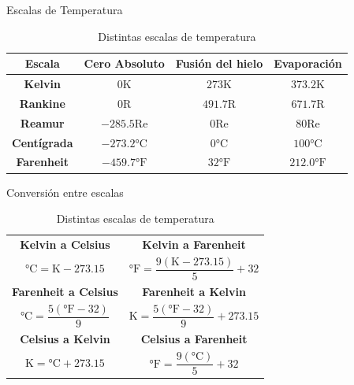 \documentclass[aspectratio=169]{beamer}
\begin{document}
\begin{frame}{Escalas de Temperatura}
\begin{table}[c]
    \centering
    \begin{tabular}{cccc}
        \toprule
        \textbf{Escala} & \textbf{Cero Absoluto} &\textbf{Fusión del hielo} & \textbf{Evaporación} \\
        \midrule
        \textbf{Kelvin} & $0\si{\kelvin}$ & $273\si{\kelvin}$ & $373.2\si{\kelvin}$ \\
        \textbf{Rankine} & $0\mathrm{R}$ & $491.7\mathrm{R}$ & $671.7\mathrm{R}$ \\
        \textbf{Reamur} & $-285.5\mathrm{Re}$ & $0\mathrm{Re}$ & $80\mathrm{Re}$ \\
        \textbf{Centígrada} & $-273.2\si{\celsius}$ & $0\si{\celsius}$ & $100\si{\celsius}$ \\
        \textbf{Farenheit} & $-459.7\si{\degree}\mathrm{F}$ & $32\si{\degree}\mathrm{F}$ & $212.0\si{\degree}\mathrm{F}$ \\
        \bottomrule
    \end{tabular}
    \caption{Distintas escalas de temperatura \cite{cengel2003termodinamica}} 
    \label{tab:limites}
\end{table}
\end{frame}
\begin{frame}{Conversión entre escalas}
\setlength{\extrarowheight}{4pt}
\begin{table}[c]
    \centering
    \begin{tabular}{|c|c|}
        \hline
        \textbf{Kelvin a Celsius} & \textbf{Kelvin a Farenheit}\\
        \Large{$\si{\celsius}=\si{\kelvin}-273.15$} & \Large{$\si{\degree}\mathrm{F}=\dfrac{9(\si{\kelvin}-273.15)}{5}+32$}\\[10pt]
        \hline
        \textbf{Farenheit a Celsius} & \textbf{Farenheit a Kelvin} \\
        \Large{$\si{\celsius}=\dfrac{5(\si{\degree}\mathrm{F}-32)}{9}$ } & \Large{$\si{\kelvin}=\dfrac{5(\si{\degree}\mathrm{F}-32)}{9}+273.15$}\\[10pt]
        \hline
        \textbf{Celsius a Kelvin} & \textbf{Celsius a Farenheit} \\
        \Large{$\si{\kelvin}=\si{\celsius}+273.15$ } & \Large{$\si{\degree}\mathrm{F}=\dfrac{9(\si{\celsius})}{5}+32$}\\[10pt]
        \hline
    \end{tabular}
    \caption{Distintas escalas de temperatura \cite{cengel2003termodinamica}}
    \label{tab:conversion}
\end{table}
\end{frame}
\end{document}
